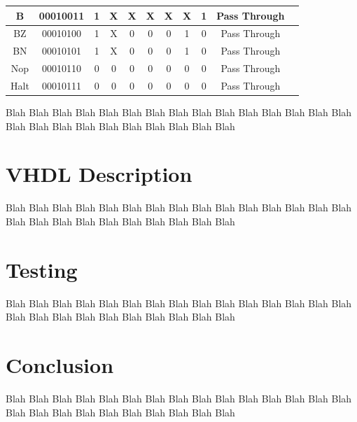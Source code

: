 \documentclass[letter,14pt]{article}
\begin{document}
\begin{table}[H]
\begin{tabular}{lllllllllll}
\multicolumn{1}{|c|}{B} & \multicolumn{1}{c|}{00010011} & \multicolumn{1}{c|}{1} & \multicolumn{1}{c|}{X} & \multicolumn{1}{c|}{X} & \multicolumn{1}{c|}{X} & \multicolumn{1}{c|}{X} & \multicolumn{1}{c|}{X} & \multicolumn{1}{c|}{1} & \multicolumn{1}{c|}{Pass Through} \TBstrut \\[1em] \hline
\multicolumn{1}{|c|}{BZ} & \multicolumn{1}{c|}{00010100} & \multicolumn{1}{c|}{1} & \multicolumn{1}{c|}{X} & \multicolumn{1}{c|}{0} & \multicolumn{1}{c|}{0} & \multicolumn{1}{c|}{0} & \multicolumn{1}{c|}{1} & \multicolumn{1}{c|}{0} & \multicolumn{1}{c|}{Pass Through} \TBstrut \\[1em] \hline
\multicolumn{1}{|c|}{BN} & \multicolumn{1}{c|}{00010101} & \multicolumn{1}{c|}{1} & \multicolumn{1}{c|}{X} & \multicolumn{1}{c|}{0} & \multicolumn{1}{c|}{0} & \multicolumn{1}{c|}{0} & \multicolumn{1}{c|}{1} & \multicolumn{1}{c|}{0} & \multicolumn{1}{c|}{Pass Through} \TBstrut \\[1em] \hline
\multicolumn{1}{|c|}{Nop} & \multicolumn{1}{c|}{00010110} & \multicolumn{1}{c|}{0} & \multicolumn{1}{c|}{0} & \multicolumn{1}{c|}{0} & \multicolumn{1}{c|}{0} & \multicolumn{1}{c|}{0} & \multicolumn{1}{c|}{0} & \multicolumn{1}{c|}{0} & \multicolumn{1}{c|}{Pass Through} \TBstrut \\[1em] \hline
\multicolumn{1}{|c|}{Halt} & \multicolumn{1}{c|}{00010111} & \multicolumn{1}{c|}{0} & \multicolumn{1}{c|}{0} & \multicolumn{1}{c|}{0} & \multicolumn{1}{c|}{0} & \multicolumn{1}{c|}{0} & \multicolumn{1}{c|}{0} & \multicolumn{1}{c|}{0} & \multicolumn{1}{c|}{Pass Through} \TBstrut \\[1em] \hline
\end{tabular}
\end{table}
\noindent
Blah Blah Blah Blah Blah Blah Blah Blah Blah Blah Blah Blah Blah Blah Blah Blah Blah Blah Blah Blah Blah Blah Blah Blah Blah 

\section{VHDL Description}
Blah Blah Blah Blah Blah Blah Blah Blah Blah Blah Blah Blah Blah Blah Blah Blah Blah Blah Blah Blah Blah Blah Blah Blah Blah 
\section{Testing}
Blah Blah Blah Blah Blah Blah Blah Blah Blah Blah Blah Blah Blah Blah Blah Blah Blah Blah Blah Blah Blah Blah Blah Blah Blah 
\section{Conclusion}
Blah Blah Blah Blah Blah Blah Blah Blah Blah Blah Blah Blah Blah Blah Blah Blah Blah Blah Blah Blah Blah Blah Blah Blah Blah
\end{document}
